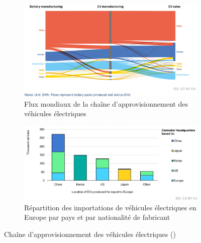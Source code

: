 \begin{figure}[!h]
\centering
\begin{subfigure}{0.8\textwidth}
    \includegraphics[width=\textwidth]{Images/supply_chain/sankey_diagram_EV.jpg}
    \caption{Flux mondiaux de la chaîne d'approvisionnement des véhicules électriques}
    \label{fig:EV_sankey}
\end{subfigure}
\hfill
\begin{subfigure}{0.8\textwidth}
    \includegraphics[width=\textwidth]{Images/supply_chain/Europe_EV_imports_bis.jpg}
    \caption{Répartition des importations de véhicules électriques en Europe par pays et par nationalité de fabricant}
    \label{fig:EV_Europe}
\end{subfigure}

\caption{Chaîne d'approvisionnement des véhicules électriques (\cite{iea_energy_2023})}
\label{fig:supply_key_elements_EV}
\end{figure}
\clearpage